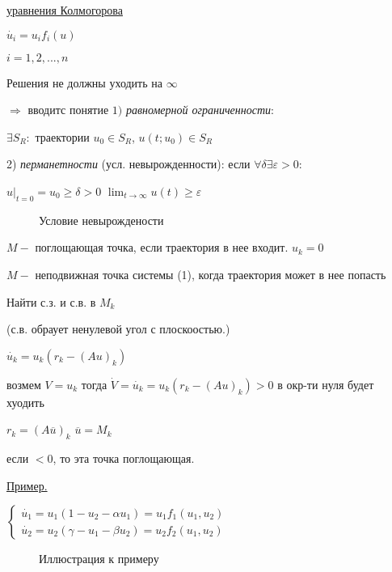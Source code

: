 \vspace{0.5cm}
\underline{уравнения Колмогорова}

\vspace{0.5cm}
\(
\dot{u_i} = u_if_i(u)
\)

\(
i = 1,2,...,n
\)

\vspace{0.5cm}
Решения не должны уходить на $\infty$ 

$\Rightarrow$ вводитс понятие $1)$ \textit{равномерной ограниченности}:

$\exists S_R : $ траектории $u_0 \in S_R$, \hspace{0.2cm} $u(t;u_0) \in S_R$

2) \textit{перманетности} (усл. невырожденности): если $\forall\delta \exists\varepsilon > 0:$

$u|_{t=0} = u_0 \geq \delta > 0$ \hspace{0.2cm} $\lim_{t \to \infty} u(t) \geq\varepsilon$

\vspace{0.5cm}

\begin{figure} [h!]
			\caption{Условие невырождености}	
\end{figure}

$M - $ поглощающая точка, если траектория в нее входит. $u_k=0$

$M -$ неподвижная точка системы (1), когда траектория может в нее попасть

Найти с.з. и с.в. в $M_k$

(с.в. обраует ненулевой угол с плоскоостью.)


$\dot{u_k} = u_k(r_k - (Au)_k)$

возмем $ V = u_k$
тогда $ \dot{V} = \dot{u_k} = u_k(r_k - (Au)_k) > 0$\hspace{0.2cm} в окр-ти нуля будет хуодить

$r_k = (A\overline{u})_k$ \hspace{0.2cm} $\overline{u} = M_k$

если $<0$, то эта точка поглощающая.

\underline{Пример.}

\vspace{0.5cm}
\(
	\begin{cases}
	\dot{u_1} = u_1(1-u_2-\alpha u_1) = u_1 f_1(u_1,u_2)
	\\
	\dot{u_2} = u_2(\gamma - u_1 - \beta u_2) = u_2f_2(u_1,u_2)
	\end{cases}
\)
\begin{figure} [h!]
			\caption{Иллюстрация к примеру}	
\end{figure}

